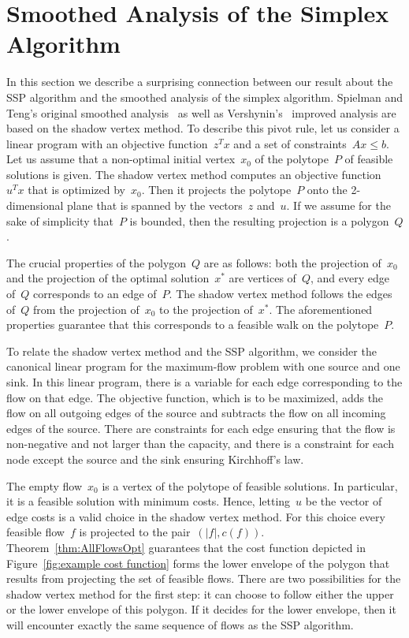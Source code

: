 \documentclass[11pt]{article}
\begin{document}
\section{Smoothed Analysis of the Simplex Algorithm}
\label{sec:simplex}

In this section we describe a surprising connection between our result about the SSP algorithm and the smoothed analysis of the
simplex algorithm. Spielman and Teng's original smoothed analysis~\cite{DBLP:journals/jacm/SpielmanT04} as well as 
Vershynin's~\cite{DBLP:journals/siamcomp/Vershynin09} improved analysis are based on the shadow vertex method. To describe this
pivot rule, let us consider a linear program with an objective function~$z^Tx$ and a set of constraints~$Ax\le b$. Let us
assume that a non-optimal initial
vertex~$x_0$ of the polytope~$P$ of feasible solutions is given. The shadow vertex method computes an objective function~$u^Tx$ that is
optimized by~$x_0$. Then it projects the polytope~$P$ onto the 2-dimensional plane that is spanned by the vectors~$z$ and~$u$. If we assume
for the sake of simplicity that~$P$ is bounded, then the resulting projection is a polygon~$Q$.

The crucial properties of the polygon~$Q$ are as follows: both the projection of~$x_0$ and the projection of the optimal solution~$x^*$ are vertices of~$Q$, and every edge of~$Q$ corresponds to an edge of~$P$. The shadow vertex method follows the edges of~$Q$ from the projection
of~$x_0$ to the projection of~$x^*$. The aforementioned properties guarantee that this corresponds to a feasible walk on the polytope~$P$. 

To relate the shadow vertex method and the SSP algorithm, we consider the canonical linear program for the maximum-flow problem with one
source and one sink. In this linear program, there is a variable for each edge corresponding to the flow on that edge.
The objective function, which is to be
maximized, adds the flow on all outgoing edges of the source and subtracts the flow on all incoming edges of the source. There are constraints for each edge 
ensuring that the flow is non-negative and not larger than the capacity, and there is a constraint for each node except the source and the sink ensuring
Kirchhoff's law.

The empty flow~$x_0$ is a vertex of the polytope of feasible solutions. In particular, it is a feasible solution with minimum costs. Hence, letting~$u$ be
the vector of edge costs is a valid choice in the shadow vertex method. For this choice every feasible flow~$f$ is projected to the pair~$(|f|, c(f))$. 
Theorem~\ref{thm:AllFlowsOpt} guarantees that the cost function depicted in Figure~\ref{fig:example cost function} forms the lower envelope of the  
polygon that results from projecting the set of feasible flows. There are two possibilities for the shadow vertex method for the first step: it can choose
to follow either the upper or the lower envelope of this polygon. If it decides for the lower envelope, then it will encounter exactly the same sequence of flows
as the SSP algorithm.
\end{document}
